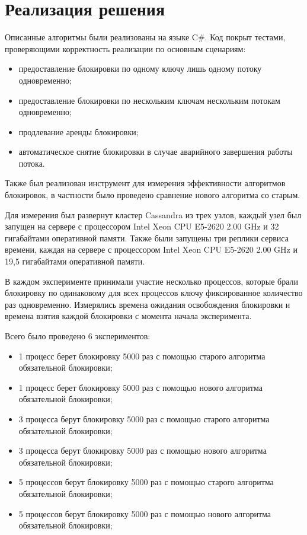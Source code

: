\section{Реализация решения}

Описанные алгоритмы были реализованы на языке C\#. Код покрыт тестами, проверяющими корректность реализации по основным сценариям:
\begin{itemize}
	\item предоставление блокировки по одному ключу лишь одному потоку одновременно;
	\item предоставление блокировки по нескольким ключам нескольким потокам одновременно;
	\item продлевание аренды блокировки;
	\item автоматическое снятие блокировки в случае аварийного завершения работы потока.
\end{itemize}

Также был реализован инструмент для измерения эффективности алгоритмов блокировок, в частности было проведено сравнение нового алгоритма со старым.

Для измерения был развернут кластер Cassandra из трех узлов, каждый узел был запущен на сервере с процессором Intel Xeon CPU E5-2620 2.00 GHz и 32 гигабайтами оперативной памяти.
Также были запущены три реплики сервиса времени, каждая на сервере с процессором Intel Xeon CPU E5-2620 2.00 GHz и 19,5 гигабайтами оперативной памяти.

В каждом эксперименте принимали участие несколько процессов, которые брали блокировку по одинаковому для всех процессов ключу фиксированное количество раз одновременно.
Измерялись времена ожидания освобождения блокировки и времена взятия каждой блокировки с момента начала эксперимента.

Всего было проведено 6 экспериментов:
\begin{itemize}
	\item 1 процесс берет блокировку 5000 раз с помощью старого алгоритма обязательной блокировки;
	\item 1 процесс берет блокировку 5000 раз с помощью нового алгоритма обязательной блокировки;
	\item 3 процесса берут блокировку 5000 раз с помощью старого алгоритма обязательной блокировки;
	\item 3 процесса берут блокировку 5000 раз с помощью нового алгоритма обязательной блокировки;
	\item 5 процессов берут блокировку 5000 раз с помощью старого алгоритма обязательной блокировки;
	\item 5 процессов берут блокировку 5000 раз с помощью нового алгоритма обязательной блокировки;
\end{itemize}

